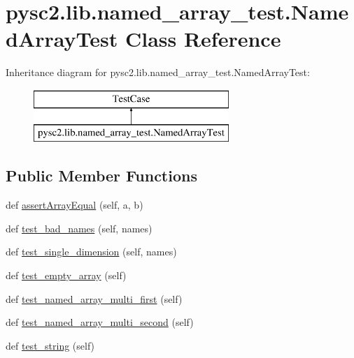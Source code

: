 \hypertarget{classpysc2_1_1lib_1_1named__array__test_1_1_named_array_test}{}\section{pysc2.\+lib.\+named\+\_\+array\+\_\+test.\+Named\+Array\+Test Class Reference}
\label{classpysc2_1_1lib_1_1named__array__test_1_1_named_array_test}
Inheritance diagram for pysc2.\+lib.\+named\+\_\+array\+\_\+test.\+Named\+Array\+Test\+:\begin{figure}[H]
\begin{center}
\leavevmode
\includegraphics[height=2.000000cm]{classpysc2_1_1lib_1_1named__array__test_1_1_named_array_test}
\end{center}
\end{figure}
\subsection*{Public Member Functions}
\begin{DoxyCompactItemize}
\item 
def \mbox{\hyperlink{classpysc2_1_1lib_1_1named__array__test_1_1_named_array_test_a73012d8abe25bb19ab3a25d942f0c882}{assert\+Array\+Equal}} (self, a, b)
\item 
def \mbox{\hyperlink{classpysc2_1_1lib_1_1named__array__test_1_1_named_array_test_ae88253c67fac6a047be8b7770aac3b43}{test\+\_\+bad\+\_\+names}} (self, names)
\item 
def \mbox{\hyperlink{classpysc2_1_1lib_1_1named__array__test_1_1_named_array_test_ad8b9ed61ee94a9eb08d42e6c3fc176f1}{test\+\_\+single\+\_\+dimension}} (self, names)
\item 
def \mbox{\hyperlink{classpysc2_1_1lib_1_1named__array__test_1_1_named_array_test_aa6bcf6475e28d44dcc0be98c966e3bb6}{test\+\_\+empty\+\_\+array}} (self)
\item 
def \mbox{\hyperlink{classpysc2_1_1lib_1_1named__array__test_1_1_named_array_test_a57f23c7030de95d56d2961b71b3bb717}{test\+\_\+named\+\_\+array\+\_\+multi\+\_\+first}} (self)
\item 
def \mbox{\hyperlink{classpysc2_1_1lib_1_1named__array__test_1_1_named_array_test_afd376f0b0a9b94dabc41b03419fbf334}{test\+\_\+named\+\_\+array\+\_\+multi\+\_\+second}} (self)
\item 
def \mbox{\hyperlink{classpysc2_1_1lib_1_1named__array__test_1_1_named_array_test_a4f1423d62d663f90674af8dbfa6162cf}{test\+\_\+string}} (self)
\end{DoxyCompactItemize}


